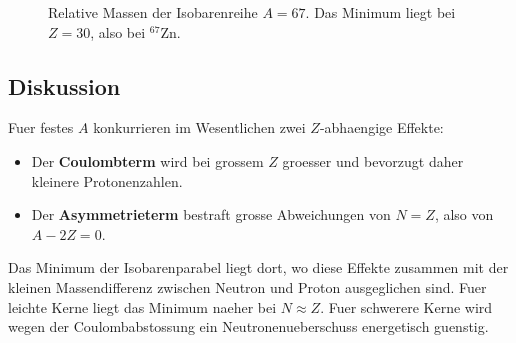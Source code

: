 \documentclass[11pt,a4paper]{scrartcl}
\newcommand{\MeV}{\si{MeV}}
\newcommand{\isotope}[2]{^{#1}\mathrm{#2}}
\theoremstyle{definition}
\theoremstyle{plain}
\theoremstyle{remark}
\begin{document}
\begin{figure}[h]
\centering
{}
\caption{Relative Massen der Isobarenreihe $A=67$. Das Minimum liegt bei $Z=30$, also bei $\isotope{67}{Zn}$.}
\end{figure}

\FloatBarrier

\subsection{Diskussion}
\begin{solutionbox}[title=Physikalische Interpretation]
Fuer festes $A$ konkurrieren im Wesentlichen zwei $Z$-abhaengige Effekte:
\begin{itemize}
    \item Der \textbf{Coulombterm} wird bei grossem $Z$ groesser und bevorzugt daher kleinere Protonenzahlen.
    \item Der \textbf{Asymmetrieterm} bestraft grosse Abweichungen von $N=Z$, also von $A-2Z=0$.
\end{itemize}
Das Minimum der Isobarenparabel liegt dort, wo diese Effekte zusammen mit der kleinen Massendifferenz zwischen Neutron und Proton ausgeglichen sind. Fuer leichte Kerne liegt das Minimum naeher bei $N\approx Z$. Fuer schwerere Kerne wird wegen der Coulombabstossung ein Neutronenueberschuss energetisch guenstig.
\end{solutionbox}
\end{document}
